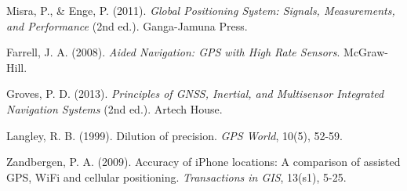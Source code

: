 \documentclass[12pt,a4paper]{article}
\begin{document}
\begin{thebibliography}{99}
Misra, P., \& Enge, P. (2011). \textit{Global Positioning System: Signals, Measurements, and Performance} (2nd ed.). Ganga-Jamuna Press.

Farrell, J. A. (2008). \textit{Aided Navigation: GPS with High Rate Sensors}. McGraw-Hill.

Groves, P. D. (2013). \textit{Principles of GNSS, Inertial, and Multisensor Integrated Navigation Systems} (2nd ed.). Artech House.

Langley, R. B. (1999). Dilution of precision. \textit{GPS World}, 10(5), 52-59.

Zandbergen, P. A. (2009). Accuracy of iPhone locations: A comparison of assisted GPS, WiFi and cellular positioning. \textit{Transactions in GIS}, 13(s1), 5-25.

\end{thebibliography}
\end{document}
